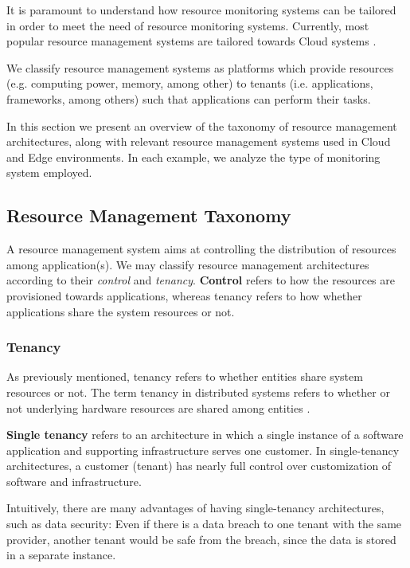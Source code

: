 
It is paramount to understand how resource monitoring systems can be tailored in order to meet the need of resource monitoring systems. Currently, most popular resource management systems are tailored towards Cloud systems \cite{Vavilapalli2013ApacheHY} \cite{hindman2011mesos} \cite{mace2015retro} \cite{verma2015large}. 

We classify resource management systems as platforms which provide resources  (e.g. computing power, memory, among other) to tenants (i.e. applications, frameworks, among others) such that applications can perform their tasks. 

In this section we present an overview of the taxonomy of resource management architectures, along with relevant resource management systems used in Cloud and Edge environments. In each example, we analyze the type of monitoring system employed.

\subsection{Resource Management Taxonomy}

A resource management system aims at controlling the distribution of resources among application(s). We may classify resource management architectures according to their \textit{control} and \textit{tenancy}. \textbf{Control} refers to how the resources are provisioned towards applications, whereas tenancy refers to how whether applications share the system resources or not.

\subsubsection{Tenancy}

As previously mentioned, tenancy refers to whether entities share system resources or not. The term tenancy in distributed systems refers to whether or not underlying hardware resources are shared among entities \cite{Hong2019}.

\textbf{Single tenancy} refers to an architecture in which a single instance of a software application and supporting infrastructure serves one customer. In single-tenancy architectures, a customer (tenant) has nearly full control over customization of software and infrastructure. 

Intuitively, there are many advantages of having single-tenancy architectures, such as data security: Even if there is a data breach to one tenant with the same provider, another tenant would be safe from the breach, since the data is stored in a separate instance.

